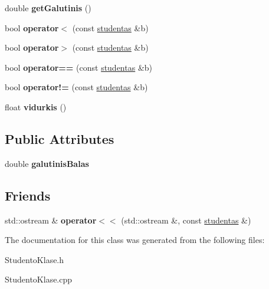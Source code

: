 \begin{DoxyCompactItemize}
double {\bfseries get\+Galutinis} ()
\item 
\mbox{\label{classstudentas_a10084bfd49a36bedd7f77226cdca2a1a}} 
bool {\bfseries operator$<$} (const \mbox{\hyperlink{classstudentas}{studentas}} \&b)
\item 
\mbox{\label{classstudentas_a68c8fd26d5befb0c521f3170c1c2a542}} 
bool {\bfseries operator$>$} (const \mbox{\hyperlink{classstudentas}{studentas}} \&b)
\item 
\mbox{\label{classstudentas_a960757de63619692bdd09f6859e21d0e}} 
bool {\bfseries operator==} (const \mbox{\hyperlink{classstudentas}{studentas}} \&b)
\item 
\mbox{\label{classstudentas_ad25aa5e16d18a16b6fdeb2bc4d37fc2f}} 
bool {\bfseries operator!=} (const \mbox{\hyperlink{classstudentas}{studentas}} \&b)
\item 
\mbox{\label{classstudentas_a1eff13c6422d7317867d39ce1ff8e4ba}} 
float {\bfseries vidurkis} ()
\end{DoxyCompactItemize}
\subsection*{Public Attributes}
\begin{DoxyCompactItemize}
\item 
\mbox{\label{classstudentas_a71d9b5c9675cba2edb27add7099f64df}} 
double {\bfseries galutinis\+Balas}
\end{DoxyCompactItemize}
\subsection*{Friends}
\begin{DoxyCompactItemize}
\item 
\mbox{\label{classstudentas_ab670caca64616f5c67228b42be1b4ea6}} 
std\+::ostream \& {\bfseries operator$<$$<$} (std\+::ostream \&, const \mbox{\hyperlink{classstudentas}{studentas}} \&)
\end{DoxyCompactItemize}


The documentation for this class was generated from the following files\+:\begin{DoxyCompactItemize}
\item 
Studento\+Klase.\+h\item 
Studento\+Klase.\+cpp\end{DoxyCompactItemize}
